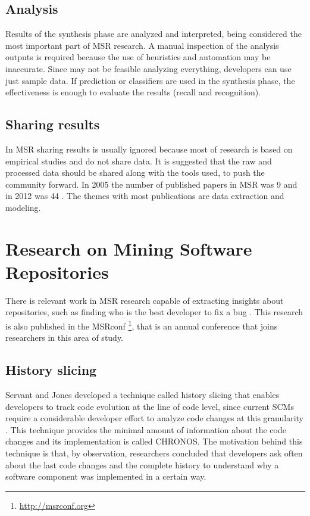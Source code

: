 \subsection{Analysis}
Results of the synthesis phase are analyzed and interpreted, being considered
the most important part of MSR research. A manual inspection of the analysis
outputs is required because the use of heuristics and automation may be
inaccurate. Since may not be feasible analyzing everything, developers can use
just sample data. If prediction or classifiers are used in the synthesis phase,
the effectiveness is enough to evaluate the results (recall and recognition).

\subsection{Sharing results}
In MSR sharing results is usually ignored because most of research is based on
empirical studies and do not share data. It is suggested that the raw and
processed data should be shared along with the tools used, to push the community
forward. In 2005 the number of published papers in MSR was 9 and in 2012 was
44 \cite{Hemmati2013}. The themes with most publications are data extraction
and modeling.


\section{Research on Mining Software Repositories}
There is relevant work in MSR research capable of extracting insights about
repositories, such as finding who is the best developer to fix a bug
\cite{Servant1}. This research is also published in the MSRconf
\footnote{\url{http://msrconf.org}}, that is an annual conference that joins
researchers in this area of study.

\subsection{History slicing}
Servant and Jones developed a technique called history slicing that enables
developers to track code evolution at the line of code level, since current
SCMs require a considerable developer effort to analyze code changes at
this granularity \cite{Servant}. This technique provides the minimal amount of
information about the code changes and its implementation is called CHRONOS.
The motivation behind this technique is that, by observation, researchers
concluded that developers ask often about the last code changes and the complete
history to understand why a software component was implemented in a certain way.

